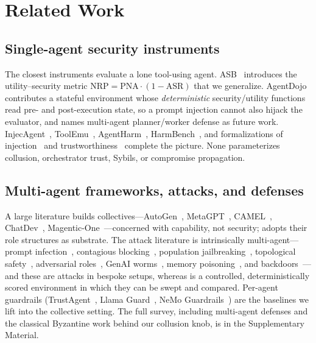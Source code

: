 \section{Related Work}
\label{sec:related}

\subsection{Single-agent security instruments}
The closest instruments evaluate a lone tool-using agent. ASB~\cite{zhang2025asb}
introduces the utility--security metric $\mathrm{NRP}=\mathrm{PNA}\cdot(1-\mathrm{ASR})$ that we
generalize. AgentDojo~\cite{debenedetti2024agentdojo} contributes a stateful environment whose
\emph{deterministic} security/utility functions read pre- and post-execution state, so a
prompt injection cannot also hijack the evaluator, and names multi-agent planner/worker
defense as future work. InjecAgent~\cite{zhan2024injecagent}, ToolEmu~\cite{ruan2024toolemu},
AgentHarm~\cite{andriushchenko2025agentharm}, HarmBench~\cite{mazeika2024harmbench}, and
formalizations of injection~\cite{liu2024formalizing} and
trustworthiness~\cite{wang2023decodingtrust} complete the picture. None parameterizes
collusion, orchestrator trust, Sybils, or compromise propagation.

\subsection{Multi-agent frameworks, attacks, and defenses}
A large literature builds collectives---AutoGen~\cite{wu2023autogen},
MetaGPT~\cite{hong2023metagpt}, CAMEL~\cite{li2023camel},
ChatDev~\cite{qian2024chatdev}, Magentic-One~\cite{fourney2024magenticone}---concerned with
capability, not security;  adopts their role structures as substrate. The attack
literature is intrinsically multi-agent---prompt infection~\cite{lee2024promptinfection},
contagious blocking~\cite{zhou2025corba}, population jailbreaking~\cite{gu2024agentsmith},
topological safety~\cite{yu2024netsafe}, adversarial roles~\cite{tian2023evilgeniuses}, GenAI
worms~\cite{cohen2024aiworm}, memory poisoning~\cite{chen2024agentpoison}, and
backdoors~\cite{yang2024watchout}---and these are attacks in bespoke setups, whereas
 is a controlled, deterministically scored environment in which they can be swept
and compared. Per-agent guardrails (TrustAgent~\cite{hua2024trustagent}, Llama
Guard~\cite{inan2023llamaguard}, NeMo Guardrails~\cite{rebedea2023nemo}) are the baselines we
lift into the collective setting. The full survey, including multi-agent defenses and the
classical Byzantine work behind our collusion knob, is in the Supplementary Material.

